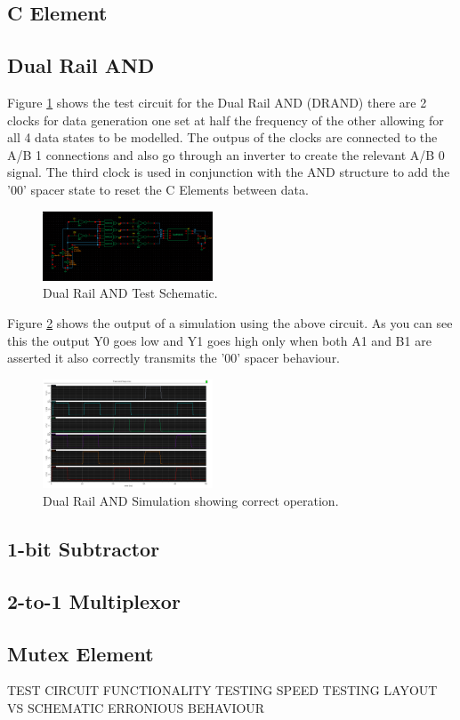 \subsection{C Element}

\subsection{Dual Rail AND}

Figure \ref{fig:DualRailANDTestSchem} shows the test circuit for the Dual Rail AND (DRAND) there are 2 clocks for data generation one set at half the frequency of the other allowing for all 4 data states to be modelled. The outpus of the clocks are connected to the A/B 1 connections and also go through an inverter to create the relevant A/B 0 signal. The third clock is used in conjunction with the AND structure to add the '00' spacer state to reset the C Elements between data.

\begin{figure}[h]  
\centering
   \includegraphics[width=0.45\textwidth]{Figures/DualRailANDTestSchem.png}
\caption{Dual Rail AND Test Schematic.}
\label {fig:DualRailANDTestSchem}
\end{figure}

Figure \ref{fig:DualAndCorrectOperation} shows the output of a simulation using the above circuit. As you can see this the output Y0 goes low and Y1  goes high only when both A1 and B1 are asserted it also correctly transmits the '00' spacer behaviour.

\begin{figure}[h]  
\centering
   \includegraphics[width=0.45\textwidth]{Figures/DualAndCorrectOperation.png}
\caption{Dual Rail AND Simulation showing correct operation.}
\label {fig:DualAndCorrectOperation}
\end{figure}









\subsection{1-bit Subtractor}

\subsection{2-to-1 Multiplexor}

\subsection{Mutex Element}

TEST CIRCUIT
FUNCTIONALITY TESTING 
SPEED TESTING
LAYOUT VS SCHEMATIC 
ERRONIOUS BEHAVIOUR